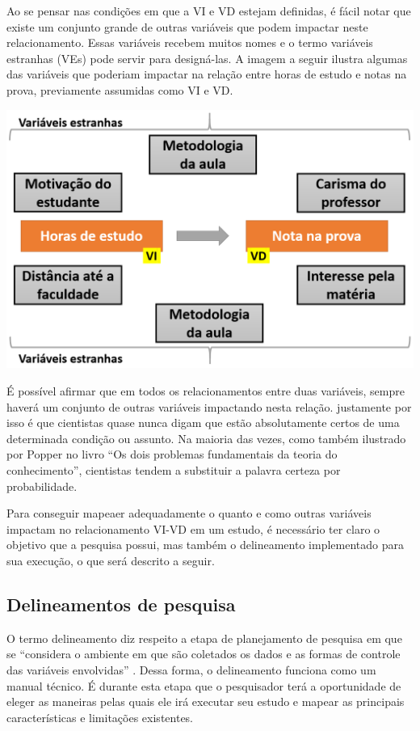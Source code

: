 \documentclass[
]{book}
\begin{document}
Ao se pensar nas condições em que a VI e VD estejam definidas, é fácil notar que existe um conjunto grande de outras variáveis que podem impactar neste relacionamento. Essas variáveis recebem muitos nomes e o termo variáveis estranhas (VEs) pode servir para designá-las. A imagem a seguir ilustra algumas das variáveis que poderiam impactar na relação entre horas de estudo e notas na prova, previamente assumidas como VI e VD.

\includegraphics{./img/cap_variavel_estranha.png}

É possível afirmar que em todos os relacionamentos entre duas variáveis, sempre haverá um conjunto de outras variáveis impactando nesta relação. justamente por isso é que cientistas quase nunca digam que estão absolutamente certos de uma determinada condição ou assunto. Na maioria das vezes, como também ilustrado por Popper no livro ``Os dois problemas fundamentais da teoria do conhecimento'', cientistas tendem a substituir a palavra certeza por probabilidade.

Para conseguir mapeaer adequadamente o quanto e como outras variáveis impactam no relacionamento VI-VD em um estudo, é necessário ter claro o objetivo que a pesquisa possui, mas também o delineamento implementado para sua execução, o que será descrito a seguir.

\hypertarget{delineamentos-de-pesquisa}{%
\subsection{Delineamentos de pesquisa}\label{delineamentos-de-pesquisa}}

O termo delineamento diz respeito a etapa de planejamento de pesquisa em que se ``considera o ambiente em que são coletados os dados e as formas de controle das variáveis envolvidas'' \citep{gil2002}. Dessa forma, o delineamento funciona como um manual técnico. É durante esta etapa que o pesquisador terá a oportunidade de eleger as maneiras pelas quais ele irá executar seu estudo e mapear as principais características e limitações existentes.
\end{document}
